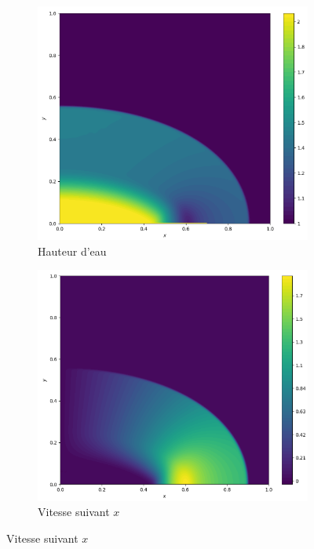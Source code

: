 \documentclass[
	french,
	11pt, %
]{fphw}
\begin{document}
\begin{figure}[H]
	\centering
	\begin{subfigure}{0.32\textwidth}
		\centering
		\includegraphics[width=\textwidth,height=0.85\textwidth]{Rusa4h.png}
		\caption{Hauteur d'eau}
		\label{fig:Rusa4h}
	\end{subfigure}
	\begin{subfigure}{0.32\textwidth}
		\centering
		\includegraphics[width=\textwidth,height=0.85\textwidth]{Rusa4u.png}
		\caption{Vitesse suivant $x$}

\end{subfigure}
\end{figure}
\end{document}
